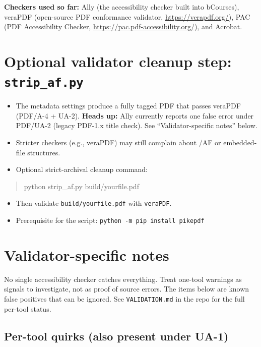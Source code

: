 \documentclass{article}
\newcommand\RedText[1]{\textcolor{AccessibleRed}{#1}}
\newcommand{\urlu}[1]{\uline{\url{#1}}}        %
\begin{document}
\noindent \textbf{Checkers used so far:} Ally (the accessibility checker built into bCourses), veraPDF (open-source PDF conformance validator, \urlu{https://verapdf.org/}), PAC (PDF Accessibility Checker, \urlu{https://pac.pdf-accessibility.org/}), and Acrobat.

\section{Optional validator cleanup step: \texttt{strip\_af.py}}

\begin{itemize}
\item The metadata settings produce a fully tagged PDF that passes veraPDF (PDF/A-4 + UA-2). \textbf{Heads up:} Ally currently reports one false error under PDF/UA-2 (legacy PDF-1.x title check). See ``Validator-specific notes'' below.
\item Stricter checkers (e.g., \RedText{veraPDF}) may still complain about /AF or embedded-file structures.
\item Optional strict-archival cleanup command:
\end{itemize}

\begin{quote}\ttfamily
python strip\_af.py build/yourfile.pdf
\end{quote}

\begin{itemize}
\item Then validate \texttt{build/yourfile.pdf} with \texttt{veraPDF}.
\item Prerequisite for the script: \texttt{python -m pip install pikepdf}
\end{itemize}

\section{Validator-specific notes}

No single accessibility checker catches everything. Treat one-tool warnings as signals to investigate, not as proof of source errors. The items below are known false positives that can be ignored. See \texttt{VALIDATION.md} in the repo for the full per-tool status.

\subsection{Per-tool quirks (also present under UA-1)}
\end{document}
